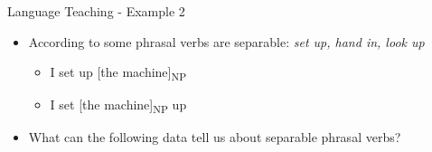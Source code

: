 \documentclass{beamer}
\begin{document}
\begin{frame}{Language Teaching - Example 2}
    \begin{itemize}
        \pause
        \item According to \cite{cowan_teachers_2008} some phrasal verbs are separable: \textit{set up, hand in, look up}
        \begin{itemize}
        \pause
        \item I set up {[}the machine{]}\textsubscript{NP}
        \pause
        \item I set {[}the machine{]}\textsubscript{NP} up 
        \end{itemize}
        \pause
        \item What can the following data tell us about separable phrasal verbs?
    \end{itemize}
        \begin{columns}
        \begin{column}{5cm}
        \begin{table}
    \centering
    \caption{set up + NP}
    \end{table}
        

\end{column}
\end{columns}
\end{frame}
\end{document}
